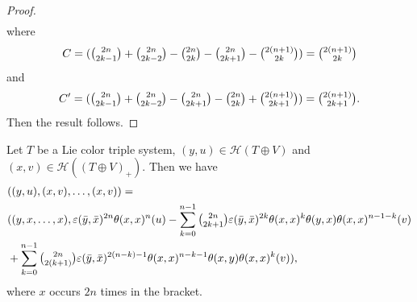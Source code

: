 \documentclass[11pt, twoside]{article}
\begin{document}
\begin{proof}
\begin{align*}
    \end{align*} where $$C=(\tbinom{2n}{2k-1}+\tbinom{2n}{2k-2}-\tbinom{2n}{2k}-\tbinom{2n}{2k+1}-\tbinom{2(n+1)}{2k})= \tbinom{2(n+1)}{2k} $$ and $$C'= (\tbinom{2n}{2k-1} +\tbinom{2n}{2k-2}-\tbinom{2n}{2k+1} -\tbinom{2n}{2k}+ \tbinom{2(n+1)}{2k+1})= \tbinom{2(n+1)}{2k+1}. $$ Then the result follows.
\end{proof}

\begin{prop}\label{p5.15}
    Let $T$ be a Lie color triple system, $(y,u)\in \mathcal{H}(T\oplus V)$ and $(x,v)\in \mathcal{H}((T\oplus V)_+) $. Then we have \begin{align*}
        &((y,u),(x,v),\dots,(x,v))=\\ & ((y,x,\dots,x), \varepsilon(\bar{y},\bar{x})^{2n}\theta(x,x)^n(u)- \sum\limits_{k=0}^{n-1}\tbinom{2n}{2k+1}\varepsilon(\bar{y},\bar{x})^{2k}\theta(x,x)^k\theta(y,x)\theta(x,x)^{n-1-k}(v) \\&+ \sum\limits_{k=0}^{n-1}\tbinom{2n}{2(k+1)}\varepsilon(\bar{y},\bar{x})^{2(n-k)-1}\theta(x,x)^{n-k-1}\theta(x,y)\theta(x,x)^k(v) )  ,
    \end{align*} where $x$ occurs $2n$ times in the bracket.
\end{prop}
\end{document}

